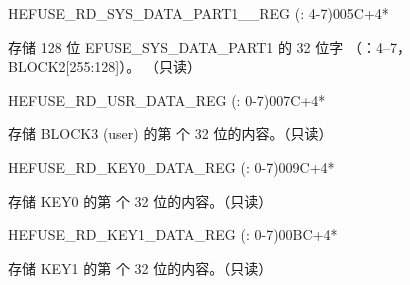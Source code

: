 \begin{register}{H}{EFUSE\_RD\_SYS\_DATA\_PART1\_\_REG (: 4-7)}{\hexprefix{}005C+4*}\label{regdesc:EFUSERDSYSDATAPART1DATA4TO7REG}
%
\regnewline%
\begin{regdesc}\begin{reglist}
\label{fielddesc:EFUSESYSDATAPART1N}\item [EFUSE\_SYS\_DATA\_PART1\_\regindex{n}] 存储 128 位 EFUSE\_SYS\_DATA\_PART1 的 32 位字 （：4–7，BLOCK2[255:128]）。 （只读）
\end{reglist}\end{regdesc}
\end{register}


\begin{register}{H}{EFUSE\_RD\_USR\_DATA\_REG (: 0-7)}{\hexprefix{}007C+4*}\label{regdesc:EFUSERDUSRDATANREG}
%
\regnewline%
\begin{regdesc}\begin{reglist}
\label{fielddesc:EFUSEUSRDATAN}\item [EFUSE\_USR\_DATA\regindex{n}] 存储 BLOCK3 (user) 的第  个 32 位的内容。（只读）
\end{reglist}\end{regdesc}
\end{register}


\begin{register}{H}{EFUSE\_RD\_KEY0\_DATA\_REG (: 0-7)}{\hexprefix{}009C+4*}\label{regdesc:EFUSERDKEY0DATANREG}
%
\regnewline%
\begin{regdesc}\begin{reglist}
\label{fielddesc:EFUSEKEY0DATAN}\item [EFUSE\_KEY0\_DATA\regindex{n}] 存储 KEY0 的第  个 32 位的内容。（只读）
\end{reglist}\end{regdesc}
\end{register}


\begin{register}{H}{EFUSE\_RD\_KEY1\_DATA\_REG (: 0-7)}{\hexprefix{}00BC+4*}\label{regdesc:EFUSERDKEY1DATANREG}
%
\regnewline%
\begin{regdesc}\begin{reglist}
\label{fielddesc:EFUSEKEY1DATAN}\item [EFUSE\_KEY1\_DATA\regindex{n}] 存储 KEY1 的第  个 32 位的内容。（只读）
\end{reglist}\end{regdesc}
\end{register}


